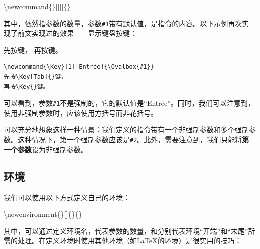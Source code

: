 \begin{dmd}
\backslash newcommand\{\}[][]\{\}
\end{dmd}

其中，依然指参数的数量，参数\verb|#1|带有默认值，是指令的内容。以下示例再次实现了前文实现过的效果——显示键盘按键：

\begin{codelist}[4.22]{
  \newcommand{\Key}[1][Entrée]{\Ovalbox{#1}} 
  先按\Key[Tab]{}键，
  再按\Key{}键。
}
\begin{verbatim}
\newcommand{\Key}[1][Entrée]{\Ovalbox{#1}} 
先按\Key[Tab]{}键，
再按\Key{}键。\end{verbatim}
\end{codelist}

可以看到，参数\verb|#1|不是强制的，它的默认值是``Entrée''。同时，我们可以注意到，使用非强制参数时，应该使用方括号而非花括号。

\begin{exclamation}
可以充分地想象这样一种情景：我们定义的指令带有一个非强制参数和多个强制参数。这种情况下，第一个强制参数应该是\verb|#2|。此外，需要注意到，我们只能将\textbf{第一个参数}设为非强制参数。
\end{exclamation}

\subsection{环境}

我们可以使用以下方式定义自己的环境：

\begin{dmd}
\backslash newenvironment\{\}[]\{\}\{\}
\end{dmd}

其中，可以通过定义环境名，代表参数的数量，和分别代表环境``开端''和``末尾''所需的处理。在定义环境时使用其他环境（如\LaTeX 的环境）是很实用的技巧：

